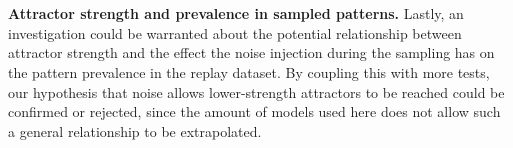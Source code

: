 \documentclass[11pt]{article}
\theoremstyle{remark}
\begin{document}
\\
\\
\noindent \textbf{Attractor strength and prevalence in sampled patterns.} Lastly, an investigation could be warranted about the potential relationship between attractor strength and the effect the noise injection during the sampling has on the pattern prevalence in the replay dataset. By coupling this with more tests, our hypothesis that noise allows lower-strength attractors to be reached could be confirmed or rejected, since the amount of models used here does not allow such a general relationship to be extrapolated.


\clearpage






\end{document}
